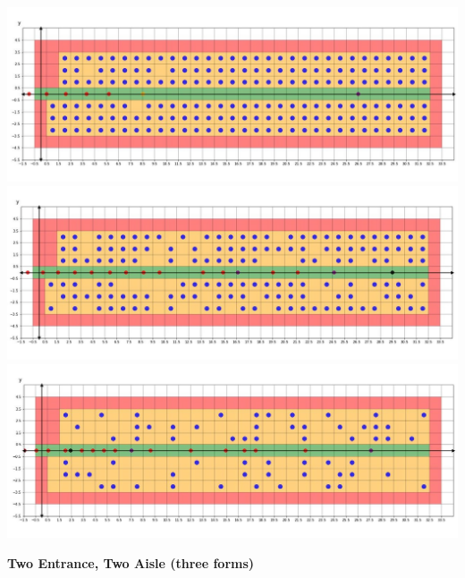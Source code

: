 \documentclass{article}
\begin{document}
	\begin{center}
		\clearpage
		\thispagestyle{empty}
		\includegraphics[width=14cm]{random1.jpg}\\
		\includegraphics[width=14cm]{random2.jpg}\\
		\includegraphics[width=14cm]{random3.jpg}\\
	\end{center}
	\large \textbf{Two Entrance, Two Aisle (three forms)}
\end{document}
